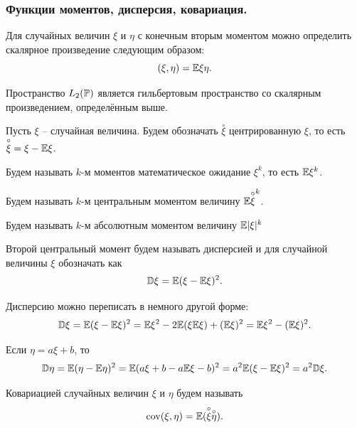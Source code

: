 \subsubsection{Функции моментов, дисперсия, ковариация.}
\begin{definition}
    Для случайных величин $\xi$ и $\eta$ с конечным вторым моментом можно определить скалярное произведение следующим образом:
    \[
        (\xi, \eta) = \Ex \xi \eta.
    \]
\end{definition}
\begin{reminder}
    Пространство $L_2(\P)$ является гильбертовым пространство со скалярным произведением, определённым выше.
\end{reminder}
\begin{definition}
    Пусть $\xi$ -- случайная величина.
    Будем обозначать $\overset{\circ}{\xi}$ центрированную $\xi$, то есть $\overset{\circ}{\xi} = \xi - \Ex \xi$.
\end{definition}
\begin{definition}
    Будем называть $k$-м моментов математическое ожидание $\xi^k$, то есть $\Ex \xi^k$.
\end{definition}
\begin{definition}
    Будем называть $k$-м центральным моментом величину $\Ex \overset{\circ}{\xi} ^k$.
\end{definition}
\begin{definition}
    Будем называть $k$-м абсолютным моментом величину $\Ex |\xi|^k$
\end{definition}
\begin{definition}
    Второй центральный момент будем называть дисперсией и для случайной величины $\xi$ обозначать как
    \[
        \D \xi = \Ex (\xi - \Ex \xi)^2.
    \]
\end{definition}
\begin{property}
    Дисперсию можно переписать в немного другой форме:
    \[
        \D \xi = \Ex(\xi - \Ex \xi)^2 = \Ex \xi^2 - 2 \Ex (\xi \Ex \xi) + (\Ex \xi)^2 = \Ex \xi^2 - (\Ex \xi)^2.
    \]
\end{property}
\begin{property}
    Если $\eta = a\xi + b$, то 
    \[
        \D \eta = \Ex(\eta - \Ex \eta)^2 = \Ex(a\xi + b - a\Ex \xi - b)^2 = a^2 \Ex(\xi - \Ex \xi)^2 = a^2 \D \xi.
    \]
\end{property}
\begin{definition}
    Ковариацией случайных величин $\xi$ и $\eta$ будем называть 
    \[
        \cov(\xi, \eta) = \Ex(\overset{\circ}{\xi}\overset{\circ}{\eta}).
    \]
\end{definition}
